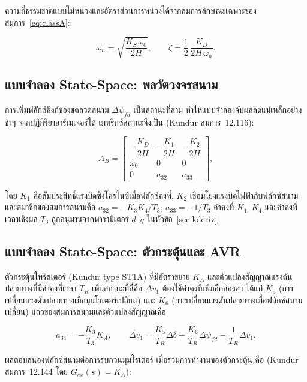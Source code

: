 \documentclass[12pt,a4paper]{article}
\newcommand{\ddel}{\Delta\delta}
\newcommand{\dpsifd}{\Delta\psi_{fd}}
\begin{document}
ความถี่ธรรมชาติแบบไม่หน่วงและอัตราส่วนการหน่วงได้จากสมการลักษณะเฉพาะของสมการ~\eqref{eq:classA}:

\begin{equation}
\omega_n = \sqrt{\frac{K_S\,\omega_0}{2H}},
\qquad
\zeta = \frac{1}{2}\,\frac{K_D}{2H\,\omega_n}.
\label{eq:wn}
\end{equation}

\subsection{แบบจำลอง State-Space: พลวัตวงจรสนาม}

การเพิ่มฟลักซ์ลิงก์ของขดลวดสนาม $\dpsifd$ เป็นสถานะที่สาม
ทำให้แบบจำลองจับผลลดแม่เหล็กอย่างช้าๆ จากปฏิกิริยาอาร์เมเจอร์ได้
เมทริกซ์สถานะจึงเป็น (Kundur สมการ~12.116):

\begin{equation}
A_B =
\begin{bmatrix}
-\dfrac{K_D}{2H} & -\dfrac{K_1}{2H} & -\dfrac{K_2}{2H} \\[2ex]
\omega_0 & 0 & 0 \\[1ex]
0 & a_{32} & a_{33}
\end{bmatrix},
\end{equation}

โดย $K_1$ คือสัมประสิทธิ์แรงบิดซิงโครไนซ์เมื่อฟลักซ์คงที่,
$K_2$ เชื่อมโยงแรงบิดไฟฟ้ากับฟลักซ์สนาม และสมาชิกของสมการสนามคือ
$a_{32} = -K_3 K_4 / T_3$, $a_{33} = -1/T_3$
ค่าคงที่ $K_1$--$K_4$ และค่าคงที่เวลาเชิงผล $T_3$
ถูกอนุมานจากพารามิเตอร์ $d$--$q$ ในหัวข้อ~\ref{sec:kderiv}

\subsection{แบบจำลอง State-Space: ตัวกระตุ้นและ AVR}

ตัวกระตุ้นไทริสเตอร์ (Kundur type ST1A) ที่มีอัตราขยาย $K_A$
และตัวแปลงสัญญาณแรงดันปลายทางที่มีค่าคงที่เวลา $T_R$ เพิ่มสถานะที่สี่คือ $\Delta v_1$
ต้องใช้ค่าคงที่เพิ่มอีกสองค่า ได้แก่ $K_5$ (การเปลี่ยนแรงดันปลายทางเมื่อมุมโรเตอร์เปลี่ยน)
และ $K_6$ (การเปลี่ยนแรงดันปลายทางเมื่อฟลักซ์สนามเปลี่ยน)
แถวของสมการสนามและตัวแปลงสัญญาณคือ

\begin{equation}
a_{34} = -\frac{K_3}{T_3}K_A,
\qquad
\dot{\Delta v_1} = \frac{K_5}{T_R}\ddel + \frac{K_6}{T_R}\dpsifd
- \frac{1}{T_R}\Delta v_1.
\end{equation}

ผลตอบสนองฟลักซ์สนามต่อการรบกวนมุมโรเตอร์ เมื่อรวมการทำงานของตัวกระตุ้น คือ
(Kundur สมการ~12.144 โดย $G_{ex}(s)=K_A$):
\end{document}
